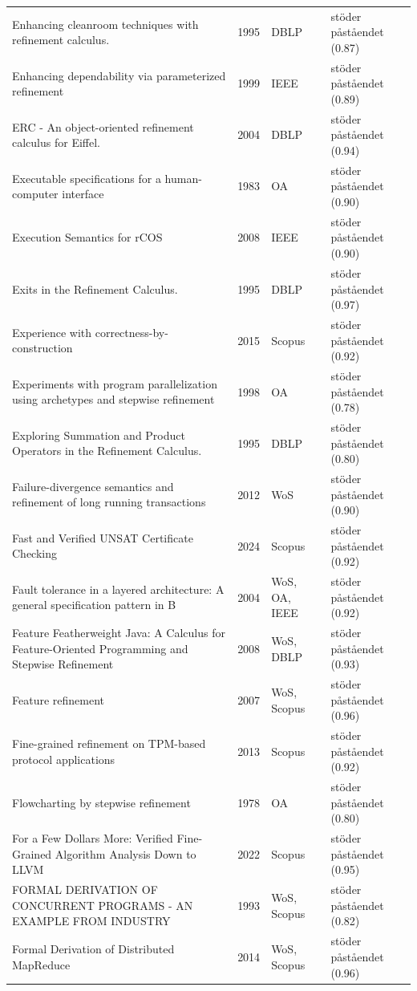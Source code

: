 \begin{longtable}{@{}%
  >{\raggedright\arraybackslash}p{}c%
  >{\raggedright\arraybackslash}p{}%
  >{\raggedright\arraybackslash}p{}@{}}
Enhancing cleanroom techniques with refinement calculus. & 1995 & DBLP & stöder påståendet (0.87) \\
Enhancing dependability via parameterized refinement & 1999 & IEEE & stöder påståendet (0.89) \\
ERC - An object-oriented refinement calculus for Eiffel. & 2004 & DBLP & stöder påståendet (0.94) \\
Executable specifications for a human-computer interface & 1983 & OA & stöder påståendet (0.90) \\
Execution Semantics for rCOS & 2008 & IEEE & stöder påståendet (0.90) \\
Exits in the Refinement Calculus. & 1995 & DBLP & stöder påståendet (0.97) \\
Experience with correctness-by-construction & 2015 & Scopus & stöder påståendet (0.92) \\
Experiments with program parallelization using archetypes and stepwise refinement & 1998 & OA & stöder påståendet (0.78) \\
Exploring Summation and Product Operators in the Refinement Calculus. & 1995 & DBLP & stöder påståendet (0.80) \\
Failure-divergence semantics and refinement of long running transactions & 2012 & WoS & stöder påståendet (0.90) \\
Fast and Verified UNSAT Certificate Checking & 2024 & Scopus & stöder påståendet (0.92) \\
Fault tolerance in a layered architecture: A general specification pattern in B & 2004 & WoS, OA, IEEE & stöder påståendet (0.92) \\
Feature Featherweight Java: A Calculus for Feature-Oriented Programming and Stepwise Refinement & 2008 & WoS, DBLP & stöder påståendet (0.93) \\
Feature refinement & 2007 & WoS, Scopus & stöder påståendet (0.96) \\
Fine-grained refinement on TPM-based protocol applications & 2013 & Scopus & stöder påståendet (0.92) \\
Flowcharting by stepwise refinement & 1978 & OA & stöder påståendet (0.80) \\
For a Few Dollars More: Verified Fine-Grained Algorithm Analysis Down to LLVM & 2022 & Scopus & stöder påståendet (0.95) \\
FORMAL DERIVATION OF CONCURRENT PROGRAMS - AN EXAMPLE FROM INDUSTRY & 1993 & WoS, Scopus & stöder påståendet (0.82) \\
Formal Derivation of Distributed MapReduce & 2014 & WoS, Scopus & stöder påståendet (0.96) \\

\end{longtable}
